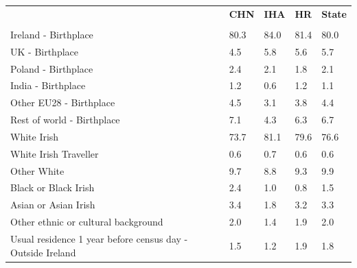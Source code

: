 \documentclass{article}
\begin{document}
\pagebreak
\begin{table}[h]	
\centering
		\begin{tabular}{KTTTT}
  \hline
& \textbf{CHN} & \textbf{IHA} & \textbf{HR}& \textbf{State}\\ 
  \hline
    \\ 
    \hline
Ireland - Birthplace & 80.3& 84.0& 81.4& 80.0\\
UK - Birthplace & 4.5& 5.8& 5.6& 5.7\\
Poland - Birthplace & 2.4& 2.1& 1.8& 2.1\\
India - Birthplace & 1.2& 0.6& 1.2& 1.1\\
Other EU28 - Birthplace & 4.5& 3.1& 3.8& 4.4\\
Rest of world - Birthplace & 7.1& 4.3& 6.3& 6.7\\
    \hline
White Irish & 73.7& 81.1& 79.6& 76.6\\
White Irish Traveller & 0.6& 0.7& 0.6& 0.6\\
Other White & 9.7& 8.8& 9.3& 9.9\\
Black or Black Irish & 2.4& 1.0& 0.8& 1.5\\
Asian or Asian Irish & 3.4& 1.8& 3.2& 3.3\\
Other ethnic or cultural background & 2.0& 1.4& 1.9& 2.0\\
    \hline
Usual residence 1 year before census day - Outside Ireland & 1.5& 1.2& 1.9& 1.8\\


\end{tabular}
\end{table}
\end{document}
